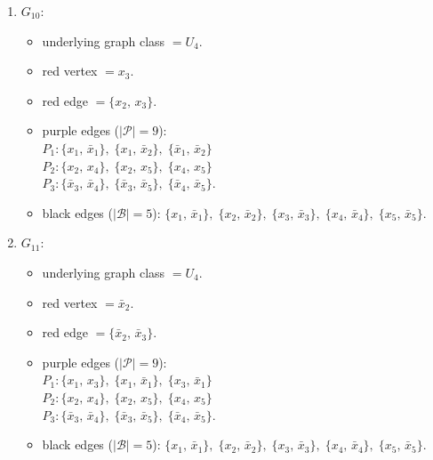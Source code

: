 \begin{enumerate}[leftmargin=*]
\begin{itemize}[leftmargin=*]
$P_{2}: \{x_{3},\,\bar{x}_{1}\},\; \{x_{3},\,\bar{x}_{2}\},\; \{\bar{x}_{1},\,\bar{x}_{2}\}$\\
$P_{3}: \{\bar{x}_{3},\,\bar{x}_{4}\},\; \{\bar{x}_{3},\,\bar{x}_{5}\},\; \{\bar{x}_{4},\,\bar{x}_{5}\}$.
\item black edges ($|\mathcal{B}|=5$): $\{x_{1},\,\bar{x}_{1}\},\; \{x_{2},\,\bar{x}_{2}\},\; \{x_{3},\,\bar{x}_{3}\},\; \{x_{4},\,\bar{x}_{4}\},\; \{x_{5},\,\bar{x}_{5}\}$.
\end{itemize}
\item $G_{10}$:
\begin{itemize}[leftmargin=*]
\item underlying graph class $= U_4$.
\item red vertex $= x_{3}$.
\item red edge $= \{x_{2},\,x_{3}\}$.
\item purple edges ($|\mathcal{P}|=9$):\mbox{}\\
$P_{1}: \{x_{1},\,\bar{x}_{1}\},\; \{x_{1},\,\bar{x}_{2}\},\; \{\bar{x}_{1},\,\bar{x}_{2}\}$\\
$P_{2}: \{x_{2},\,x_{4}\},\; \{x_{2},\,x_{5}\},\; \{x_{4},\,x_{5}\}$\\
$P_{3}: \{\bar{x}_{3},\,\bar{x}_{4}\},\; \{\bar{x}_{3},\,\bar{x}_{5}\},\; \{\bar{x}_{4},\,\bar{x}_{5}\}$.
\item black edges ($|\mathcal{B}|=5$): $\{x_{1},\,\bar{x}_{1}\},\; \{x_{2},\,\bar{x}_{2}\},\; \{x_{3},\,\bar{x}_{3}\},\; \{x_{4},\,\bar{x}_{4}\},\; \{x_{5},\,\bar{x}_{5}\}$.
\end{itemize}
\item $G_{11}$:
\begin{itemize}[leftmargin=*]
\item underlying graph class $= U_4$.
\item red vertex $= \bar{x}_{2}$.
\item red edge $= \{\bar{x}_{2},\,\bar{x}_{3}\}$.
\item purple edges ($|\mathcal{P}|=9$):\mbox{}\\
$P_{1}: \{x_{1},\,x_{3}\},\; \{x_{1},\,\bar{x}_{1}\},\; \{x_{3},\,\bar{x}_{1}\}$\\
$P_{2}: \{x_{2},\,x_{4}\},\; \{x_{2},\,x_{5}\},\; \{x_{4},\,x_{5}\}$\\
$P_{3}: \{\bar{x}_{3},\,\bar{x}_{4}\},\; \{\bar{x}_{3},\,\bar{x}_{5}\},\; \{\bar{x}_{4},\,\bar{x}_{5}\}$.
\item black edges ($|\mathcal{B}|=5$): $\{x_{1},\,\bar{x}_{1}\},\; \{x_{2},\,\bar{x}_{2}\},\; \{x_{3},\,\bar{x}_{3}\},\; \{x_{4},\,\bar{x}_{4}\},\; \{x_{5},\,\bar{x}_{5}\}$.

\end{itemize}
\end{enumerate}
